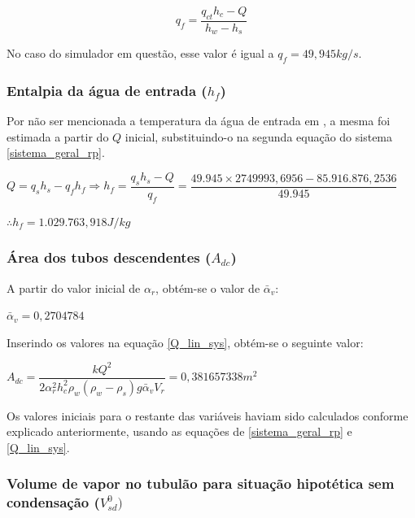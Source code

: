 \begin{equation}
  q_f=\dfrac{q_{ct} h_c - Q}{h_w - h_s}
  \label{q_f_init}
\end{equation}

No caso do simulador em questão, esse valor é igual a $q_f = 49,945
kg/s$.

\subsubsection{Entalpia da água de entrada ($h_f$)}

Por não ser mencionada a temperatura da água de entrada em
, a mesma foi estimada a partir do $Q$ inicial,
substituindo-o na segunda equação do sistema \ref{sistema_geral_rp}.

\begin{center}
  $Q = q_s h_s - q_f h_f \Rightarrow h_f = \dfrac{q_s h_s - Q}{q_f} =
  \dfrac{49.945 \times 2749993,6956 - 85.916.876,2536}{49.945}$
  
  $\therefore h_f = 1.029.763,918 J/kg$
\end{center}

\subsubsection{Área dos tubos descendentes ($A_{dc}$)}

A partir do valor inicial de $\alpha_r$, obtém-se o valor de
$\bar{\alpha}_v$:

\begin{center}
  $\bar{\alpha}_v = 0,2704784 $
\end{center}

Inserindo os valores na equação \ref{Q_lin_sys}, obtém-se o seguinte
valor:

\begin{center}
  $A_{dc} = \dfrac{ k Q^2 }{ 2 \alpha_r^2 h_c^2 \rho_w (\rho_w - \rho_s)
    g \bar{\alpha}_v V_r}  = 0,381657338 m^2$
\end{center}

Os valores iniciais para o restante das variáveis haviam sido
calculados conforme explicado anteriormente, usando as equações de
\ref{sistema_geral_rp} e \ref{Q_lin_sys}.

\subsubsection{Volume de vapor no tubulão para situação hipotética sem
  condensação ($V_{sd}^0)$}

